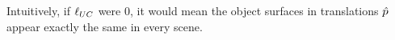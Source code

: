 \documentclass{article}
\begin{document}
		Intuitively, if $\ell_{UC}$ were $0$, it would mean the object surfaces in translations $\hat{p}$ appear exactly the same in every scene.


		

\end{document}
